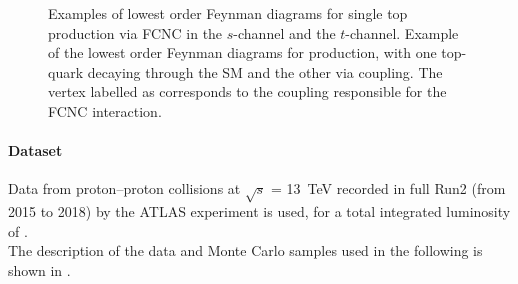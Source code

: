 \begin{figure}[htb]
	\centering
	\qquad
	\caption{Examples of lowest order Feynman diagrams for single top production via FCNC in  the $s$-channel and  the $t$-channel. Example of the lowest order Feynman diagrams for  \ttbar production, with one top-quark decaying through the SM and the other via \tZc coupling. The vertex labelled as \tZq corresponds to the coupling responsible for the FCNC interaction.}
	\label{fig:signal}
\end{figure} 

\paragraph{Dataset}
Data from proton--proton collisions at 
$\sqrt{s}$ = \SI{13}{\TeV} recorded in full Run2 (from 2015 to 2018) by the ATLAS experiment is used, for a total integrated luminosity of \lumi.\\
The description of the data and Monte Carlo samples used in the following is shown in .

